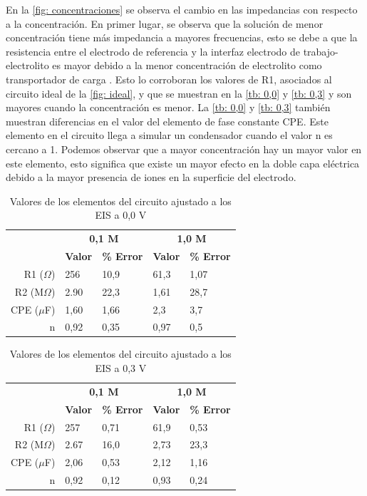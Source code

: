 \documentclass[fleqn,11pt]{SelfArx}
\begin{document}
	En la \autoref{fig: concentraciones} se observa el cambio en las impedancias con respecto a la concentración. En primer lugar, se observa que la solución de menor concentración tiene más impedancia a mayores frecuencias, esto se debe a que la resistencia entre el electrodo de referencia y la interfaz electrodo de trabajo-electrolito es mayor debido a la menor concentración de electrolito como transportador de carga \cite{suarez2011}. Esto lo corroboran los valores de R1, asociados al circuito ideal de la \autoref{fig: ideal}, y que se muestran en la \autoref{tb: 0,0} y \autoref{tb: 0,3} y son mayores cuando la concentración es menor.  La \autoref{tb: 0,0} y \autoref{tb: 0,3} también muestran diferencias en el valor del elemento de fase constante CPE. Este elemento en el circuito llega a simular un condensador cuando el valor n es cercano a 1. Podemos observar que a mayor concentración hay un mayor valor en este elemento, esto significa que existe un mayor efecto en la doble capa eléctrica debido a la mayor presencia de iones en la superficie del electrodo.
	
	\begin{table}[h]
		\caption{Valores de los elementos del circuito ajustado a los EIS a 0,0 V}
		\begin{tabular}{r|ll|ll}
			& \multicolumn{2}{c}{\textbf{0,1 M}} & \multicolumn{2}{c}{\textbf{1,0 M}} \\
			& \multicolumn{1}{c}{\textbf{Valor}} & \multicolumn{1}{c}{\textbf{\% Error}} & \multicolumn{1}{c}{\textbf{Valor}} & \multicolumn{1}{c}{\textbf{\% Error}} \\
			\hline
			R1 ($\Omega$) & 256 & 10,9 & 61,3 & 1,07 \\
			R2 (M$\Omega$) & 2.90 & 22,3 & 1,61 & 28,7 \\
			CPE ($\mu$F) & 1,60 & 1,66 & 2,3 & 3,7 \\
			n & 0,92 & 0,35 & 0,97 & 0,5 \\
			\hline
		\end{tabular}
		\label{tb: 0,0}
	\end{table}
	
	\begin{table}[h]
		\caption{Valores de los elementos del circuito ajustado a los EIS a 0,3 V}
		\begin{tabular}{r|ll|ll}
			& \multicolumn{2}{c}{\textbf{0,1 M}} & \multicolumn{2}{c}{\textbf{1,0 M}} \\
			& \multicolumn{1}{c}{\textbf{Valor}} & \multicolumn{1}{c}{\textbf{\% Error}} & \multicolumn{1}{c}{\textbf{Valor}} & \multicolumn{1}{c}{\textbf{\% Error}} \\
			\hline
			R1 ($\Omega$) & 257 & 0,71 & 61,9 & 0,53 \\
			R2 (M$\Omega$) & 2.67 & 16,0 & 2,73 & 23,3 \\
			CPE ($\mu$F) & 2,06 & 0,53 & 2,12 & 1,16 \\
			n & 0,92 & 0,12 & 0,93 & 0,24 \\
			\hline
		\end{tabular}
		\label{tb: 0,3}
	\end{table}
	
\end{document}
